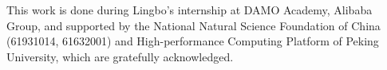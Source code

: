 \documentclass[sigconf]{acmart}
\begin{document}
\begin{acks}
	This work is done during Lingbo's internship at DAMO Academy, Alibaba Group, and supported by the National Natural Science Foundation of China (61931014, 61632001) and High-performance Computing Platform of Peking University, which are gratefully acknowledged.
\end{acks}



\end{document}
